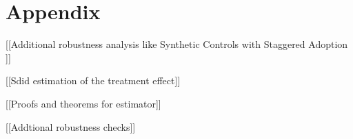 \section{Appendix}



[[Additional robustness analysis like Synthetic Controls with Staggered Adoption ]]

[[Sdid estimation of the treatment effect]]

[[Proofs and theorems for estimator]]

[[Addtional robustness checks]]
